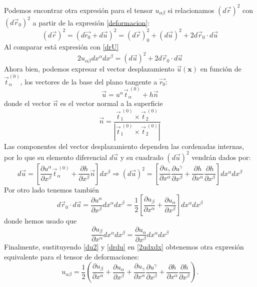 Podemos encontrar otra expresión para el tensor $u_{\alpha\beta}$ si
relacionamos $(d\vec{r})^2$ con $(d\vec{r}_0)^2$ a partir de
la expresión \eqref{deformacion}:
\begin{equation}\label{dl_vectorial}
(d\vec{r})^2=(d\vec{r_0}+d\vec{u})^2=(d\vec{r})^2_0+(d\vec{u})^2+2d\vec{r}_0\cdot d\vec{u}
\end{equation}
Al comparar está expresión con \eqref{drU}
\begin{equation}\label{2udxdx}
2u_{\alpha\beta}dx^{\alpha}dx^{\beta}=(d\vec{u})^2+2d\vec{r}_0\cdot d\vec{u}
\end{equation}
Ahora bien, podemos expresar el vector desplazamiento $\vec{u}(\mathbf{x})$ en función de
$\vec{t}^{(0)}_{\alpha}$, los vectores de la base del plano tangente a $\vec{r_0}$:
\begin{equation*}
  \vec{u}=u^{\alpha}\vec{t}^{\ (0)}_{\alpha}+h\vec{n}
\end{equation*}
donde el vector $\vec{n}$ es el vector normal a la superficie
\begin{equation}
\vec{n}=\frac{\vec{t}^{\ (0)}_1\times \vec{t}_2^{\ (0)}}{|\vec{t}^{\
    (0)}_1\times \vec{t}_2^{\ (0)}|}
\end{equation}
Las componentes del vector desplazamiento dependen las cordenadas internas, por lo que su elemento
diferencial $d\vec{u}$ y su cuadrado $(d\vec{u})^2$ vendrán dados por: 
\begin{equation}\label{du2}
d\vec{u}=\left[\frac{\partial
  u^{\alpha}}{\partial x^{\beta}}\vec{t}^{\ (0)}_{\alpha}+\frac{\partial
  h}{\partial x^{\beta}} \vec{n}\right]dx^{\beta}\Rightarrow
(d\vec{u})^2=\left[
\frac{\partial u_{\gamma}}{\partial x^{\alpha}}
\frac{\partial u^{\gamma}}{\partial x^{\beta}}+ 
\frac{\partial h}{\partial x^{\alpha}}
\frac{\partial h}{\partial x^{\beta}}\right]
dx^{\alpha}dx^{\beta} 
\end{equation}
Por otro lado tenemos también
\begin{equation}\label{drdu}
d\vec{r}_0\cdot d\vec{u}=\frac{\partial u^{\alpha}}{\partial x^{\beta}}dx^{\alpha}dx^{\beta}=\frac{1}{2}\left[\frac{\partial u_{\beta}}{\partial x^{\alpha}}+ \frac{\partial u_{\alpha}}{\partial x^{\beta}}\right]dx^{\alpha}dx^{\beta} 
\end{equation}
donde hemos usado que
 $$\frac{\partial u_{\beta}}{\partial
   x^{\alpha}}dx^{\alpha}dx^{\beta}=\frac{\partial u_{\alpha}}{\partial
   x^{\beta}}dx^{\alpha}dx^{\beta}$$
Finalmente, sustituyendo \eqref{du2} y \eqref{drdu} en \eqref{2udxdx}
obtenemos otra expresión equivalente para el tensor de deformaciones:
\begin{equation}\label{tensor_deformacion}
u_{\alpha\beta}=\frac{1}{2}\left(
 \frac{\partial u_{\beta}}{\partial x^{\alpha}}+
 \frac{\partial u_{\alpha}}{\partial x^{\beta}}+
 \frac{\partial u_{\gamma}}{\partial x^{\alpha}}
\frac{\partial u^{\gamma}}{\partial x^{\beta}}+
\frac{\partial h}{\partial  x^{\alpha}}\frac{\partial h}{\partial x^{\beta}}\right).
\end{equation}


